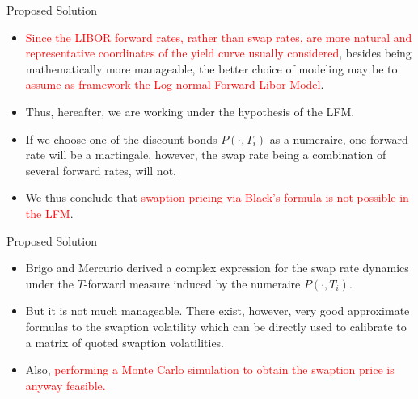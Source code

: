 \documentclass{beamer}
\begin{document}
\begin{frame}{Proposed Solution}
  \begin{itemize}
  \item<1-> \textcolor{red}{Since the LIBOR forward rates, rather than swap rates, are more natural and representative coordinates of the yield curve usually considered}, besides being mathematically more manageable, the better choice of modeling may be to \textcolor{red}{assume as framework the Log-normal Forward Libor Model}. 
  \item<2-> Thus, hereafter, we are working under the hypothesis of the LFM. 
  \item<3-> If we choose one of the discount bonds $P(\cdot, T_i)$ as a numeraire, one forward rate will be a martingale, however, the swap rate being a combination of several forward rates, will not. 
  \item<4-> We thus conclude that \textcolor{red}{swaption pricing via Black’s formula is not possible in the LFM}.
    \end{itemize}
\end{frame}

\begin{frame}{Proposed Solution}
	\begin{itemize}
  \item<1-> Brigo and Mercurio derived a complex expression for the swap rate dynamics under the $T$-forward measure induced by the numeraire $P(\cdot, T_i)$.
  \item<2-> But it is not much manageable. There exist, however, very good approximate formulas to the swaption volatility which can be directly used to calibrate to a matrix of quoted swaption volatilities.  
  \item<3-> Also, \textcolor{red}{performing a Monte Carlo simulation to obtain the swaption price is anyway feasible.} 
  
  \end{itemize}
\end{frame}
\end{document}
